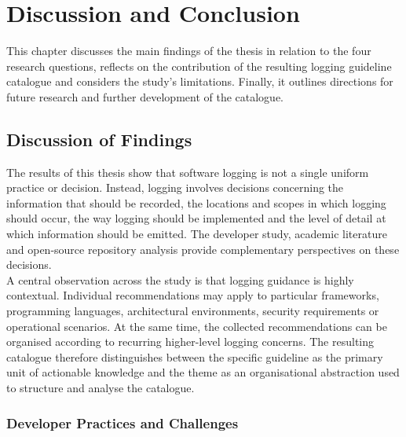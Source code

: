 \chapter{Discussion and Conclusion} \label{chap:conclusion}

This chapter discusses the main findings of the thesis in relation to the four research questions,
reflects on the contribution of the resulting logging guideline catalogue
and considers the study's limitations.
Finally, it outlines directions for future research and further development of the catalogue.

\section{Discussion of Findings}

The results of this thesis show that software logging is not a single uniform practice or decision.
Instead, logging involves decisions concerning the information that should be recorded,
the locations and scopes in which logging should occur, the way logging should be implemented
and the level of detail at which information should be emitted. The developer study, 
academic literature and open-source repository analysis provide complementary perspectives on these decisions.
\\
A central observation across the study is that logging guidance is highly contextual.
Individual recommendations may apply to particular frameworks, programming languages,
architectural environments, security requirements or operational scenarios. 
At the same time, the collected recommendations can be organised according to recurring higher-level logging concerns. 
The resulting catalogue therefore distinguishes between the specific guideline as the primary unit of actionable knowledge 
and the theme as an organisational abstraction used to structure and analyse the catalogue.

\subsection{Developer Practices and Challenges}

